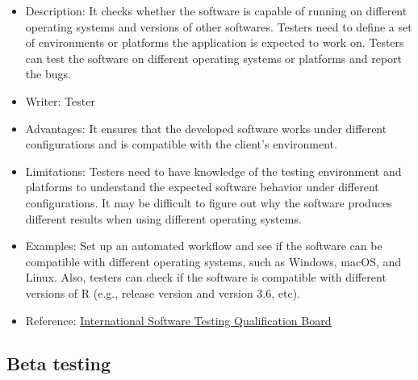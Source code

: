 \documentclass[
]{book}
\begin{document}
\begin{itemize}
\item
  Description: It checks whether the software is capable of running on different operating systems and versions of other softwares. Testers need to define a set of environments or platforms the application is expected to work on. Testers can test the software on different operating systems or platforms and report the bugs.
\item
  Writer: Tester
\item
  Advantages: It ensures that the developed software works under different configurations and is compatible with the client's environment.
\item
  Limitations: Testers need to have knowledge of the testing environment and platforms to understand the expected software behavior under different configurations. It may be difficult to figure out why the software produces different results when using different operating systems.
\item
  Examples: Set up an automated workflow and see if the software can be compatible with different operating systems, such as Windows, macOS, and Linux. Also, testers can check if the software is compatible with different versions of R (e.g., release version and version 3.6, etc).
\item
  Reference: \href{https://glossary.istqb.org/en/search/compatibility}{\underline{International Software Testing Qualification Board}}
\end{itemize}

\hypertarget{beta-testing}{%
\subsection{Beta testing}\label{beta-testing}}
\end{document}
